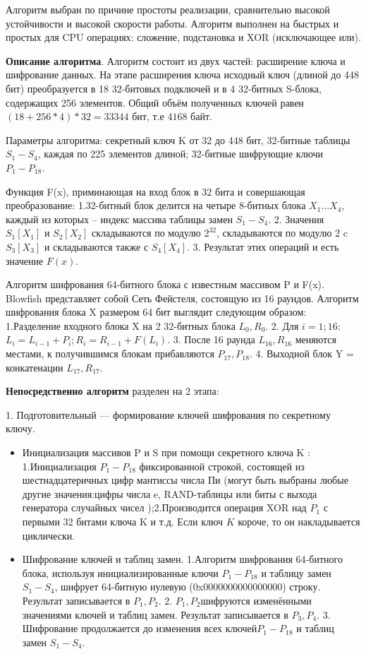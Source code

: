 Алгоритм выбран по причине простоты реализации, сравнительно высокой устойчивости и высокой скорости работы. Алгоритм выполнен на быстрых и простых для CPU операциях: сложение, подстановка и XOR (исключающее или). \cite{BF1}

\textbf{Описание алгоритма}. Алгоритм состоит из двух частей: расширение ключа и шифрование данных. На этапе расширения ключа исходный ключ (длиной до 448 бит) преобразуется в 18 32-битовых подключей и в 4 32-битных S-блока, содержащих 256 элементов. Общий объём полученных ключей равен $ ( 18 + 256 * 4 ) * 32 = 33344   $ бит, т.е  $ 4168 $ байт.

Параметры алгоритма: секретный ключ K от 32 до 448 бит, 32-битные  таблицы $ S_{1} - S_{4}$, каждая по 225 элементов длиной; 32-битные шифрующие ключи $ P_{1}-P_{18} $.

Функция F(x), приминающая на вход блок в 32 бита и совершающая преобразование: 1.32-битный блок делится на четыре 8-битных блока $ X_{1}...X_{4} $, каждый из которых -- индекс массива таблицы замен $ S_{1} - S_{4}$. 2. Значения $ S_{1}[X_{1}] $ и $ S_{2}[X_{2}] $ складываются по модулю $ 2^{32} $, складываются по модулю 2 c $ S_{3}[X_{3}] $ и складываются также с $ S_{4}[X_{4}] $. 3. Результат этих операций  и есть значение $ F(x) $.


Алгоритм шифрования 64-битного блока с известным массивом P и F(x). Blowfish представляет собой Сеть Фейстеля, состоящую из 16 раундов. Алгоритм шифрования блока  X размером 64 бит выглядит следующим образом: 1.Разделение входного блока  X на 2 32-битных блока $ L_{0}, R_{0} $. 2. Для $ i=1;16 $: $ L_{i}=L_{i-1}+P_{i}; R_{i}= R_{i-1}+F(L_{i}) $. 3. После 16 раунда $ L_{16},R_{16} $ меняются местами, к получившимся блокам прибавляются $ P_{17}, P_{18} $. 4. Выходной блок Y = конкатенации $ L_{17},R_{17} $.

\textbf{Непосредственно алгоритм} разделен на 2 этапа:

1. Подготовительный — формирование ключей шифрования по секретному ключу. 
\begin{itemize}
	\item Инициализация массивов P и S при помощи секретного ключа K : 1.Инициализация $ P_{1} - P_{18} $ фиксированной строкой, состоящей из шестнадцатеричных цифр мантиссы числа Пи (могут быть выбраны любые другие значения:цифры числа e, RAND-таблицы или биты с выхода генератора случайных чисел );2.Производится операция XOR над $ P_{1} $ с первыми 32 битами ключа K и т.д. Если ключ $ K $ короче, то он накладывается циклически.
	\item Шифрование ключей и таблиц замен.  1.Алгоритм шифрования 64-битного блока, используя инициализированные ключи $ P_{1} - P_{18} $ и таблицу замен $ S_{1} - S_{4}$, шифрует 64-битную нулевую (0x0000000000000000) строку. Результат записывается в $ P_{1}, P_{2} $. 2. $ P_{1}, P_{2} $шифруются изменёнными значениями ключей и таблиц замен. Результат записывается в $ P_{3}, P_{4} $. 3. Шифрование продолжается до изменения всех ключей$ P_{1} - P_{18} $ и таблиц замен  $ S_{1} - S_{4}$.
\end{itemize}

